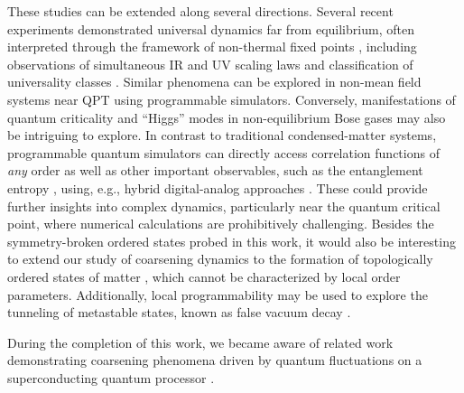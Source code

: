 \documentclass[reprint,twocolumn,secnumarabic,amssymb, aps, prx]{revtex4-2}
\begin{document}
These studies can be extended along several directions. 
Several recent experiments demonstrated universal dynamics far from equilibrium, often interpreted through the framework of non-thermal fixed points \cite{schmied2019non}, including observations of simultaneous IR and UV scaling laws \cite{glidden2021bidirectional,gazo2023universal} and classification of universality classes \cite{huh2024universality}. Similar phenomena can be explored in non-mean field systems near QPT using  programmable simulators. Conversely, manifestations of quantum criticality and ``Higgs'' modes in non-equilibrium Bose gases may also be intriguing to explore.
In contrast to traditional condensed-matter systems, programmable quantum simulators can directly access correlation functions of \textit{any} order \cite{semeghini2021probing} as well as other important observables, such as the entanglement entropy \cite{brydgesProbingRenyiEntanglement2019,teng2024learning}, using, e.g., hybrid digital-analog approaches \cite{bluvstein2022quantum,andersen2024thermalization}. These could provide further insights into complex  dynamics, particularly near the quantum critical point, where numerical calculations are prohibitively challenging. Besides the symmetry-broken ordered states probed in this work, it would also be interesting to extend our study of coarsening dynamics to the formation of topologically ordered states of matter \cite{semeghini2021probing,Samajdar.2021,Verresen.2020,ott2024probing}, which cannot be characterized by local order parameters. Additionally, local programmability may be used to explore the tunneling of metastable states, known as false vacuum decay \cite{zenesini2024false, darbha2024false,darbha2024long}.


During the completion of this work, we became aware of related work demonstrating coarsening phenomena driven by quantum fluctuations on a superconducting quantum processor 
\cite{andersen2024thermalization}.
\end{document}
